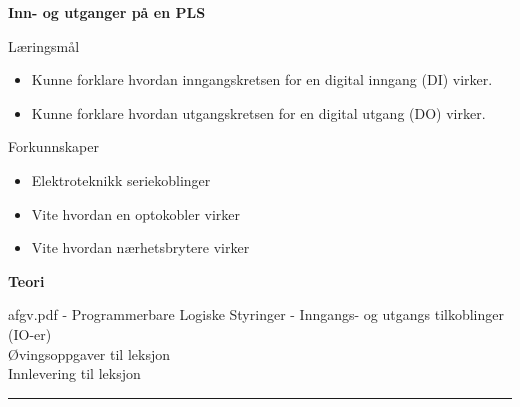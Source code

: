 \centerline{\bf Inn- og utganger på en PLS}  \bigskip
	Læringsmål
	\begin{itemize}[noitemsep]
		\item Kunne forklare hvordan inngangskretsen for en digital inngang (DI) virker. 
		\item Kunne forklare hvordan utgangskretsen for en digital utgang (DO) virker. 
	\end{itemize}

	Forkunnskaper

	\begin{itemize}[noitemsep]
		\item Elektroteknikk seriekoblinger
		\item Vite hvordan en optokobler virker
		\item Vite hvordan nærhetsbrytere virker

	\end{itemize}
\textbf{Teori}

afgv.pdf - Programmerbare Logiske Styringer - Inngangs- og utgangs tilkoblinger (IO-er)\\
Øvingsoppgaver til leksjon\\
Innlevering til leksjon
\bigskip 
\hrule
\vfil \eject

